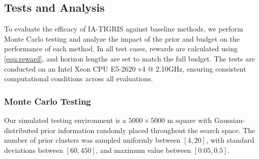 


\subsection{Tests and Analysis}
To evaluate the efficacy of IA-TIGRIS against baseline methods, we perform Monte Carlo testing and analyze the impact of the prior and budget on the performance of each method. In all test cases, rewards are calculated using \eqref{equ:reward}, and horizon lengths are set to match the full budget. The tests are conducted on an Intel Xeon CPU E5-2620 v4 @ 2.10GHz, ensuring consistent computational conditions across all evaluations.







\subsubsection{Monte Carlo Testing}
Our simulated testing environment is a $5000\times5000$ m square with Gaussian-distributed prior information randomly placed throughout the search space. The number of prior clusters was sampled uniformly between $[4,20]$, with standard deviations between $[60,450]$, and maximum value between $[0.05,0.5]$. 


